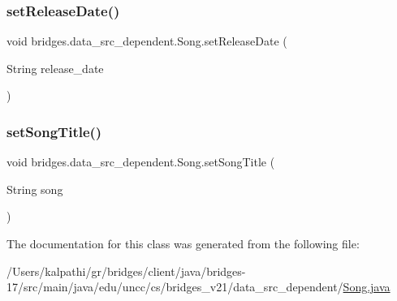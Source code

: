 \mbox{\label{classbridges_1_1data__src__dependent_1_1_song_a6534e543a295b29858cf98be7a4e276e}} 
\subsubsection{\texorpdfstring{set\+Release\+Date()}{setReleaseDate()}}
{\footnotesize\ttfamily void bridges.\+data\+\_\+src\+\_\+dependent.\+Song.\+set\+Release\+Date (\begin{DoxyParamCaption}\item[{String}]{release\+\_\+date }\end{DoxyParamCaption})}

\mbox{\label{classbridges_1_1data__src__dependent_1_1_song_a9d7540c0e6cca53ae3a105885aac5622}} 
\subsubsection{\texorpdfstring{set\+Song\+Title()}{setSongTitle()}}
{\footnotesize\ttfamily void bridges.\+data\+\_\+src\+\_\+dependent.\+Song.\+set\+Song\+Title (\begin{DoxyParamCaption}\item[{String}]{song }\end{DoxyParamCaption})}



The documentation for this class was generated from the following file\+:\begin{DoxyCompactItemize}
\item 
/\+Users/kalpathi/gr/bridges/client/java/bridges-\/17/src/main/java/edu/uncc/cs/bridges\+\_\+v21/data\+\_\+src\+\_\+dependent/\mbox{\hyperlink{_song_8java}{Song.\+java}}\end{DoxyCompactItemize}
